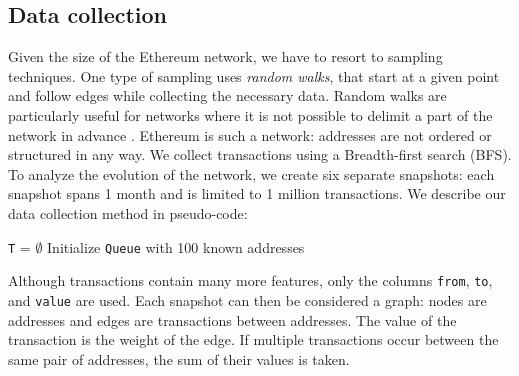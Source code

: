 \documentclass[10pt,a4paper]{article}
\begin{document}
\begin{multicols}{2}
\section{Data collection}
Given the size of the Ethereum network, we have to resort to sampling techniques. One type of sampling uses \textit{random walks}, that start at a given point and follow edges while collecting the necessary data. Random walks are particularly useful for networks where it is not possible to delimit a part of the network in advance \cite{Becchetti06acomparison}. Ethereum is such a network: addresses are not ordered or structured in any way. We collect transactions using a Breadth-first search (BFS). To analyze the evolution of the network, we create six separate snapshots: each snapshot spans 1 month and is limited to 1 million transactions. We describe our data collection method in pseudo-code:

\medskip
\begin{algorithm}[H]
\SetAlgoLined
\hspace{5pt}\texttt{T} = $\emptyset$\newline
Initialize \texttt{Queue} with 100 known addresses
\end{algorithm}

Although transactions contain many more features, only the columns \texttt{from}, \texttt{to}, and \texttt{value} are used.
Each snapshot can then be considered a graph: nodes are addresses and edges are transactions between addresses. The value of the transaction is the weight of the edge. If multiple transactions occur between the same pair of addresses, the sum of their values is taken. 


\end{multicols}
\end{document}
